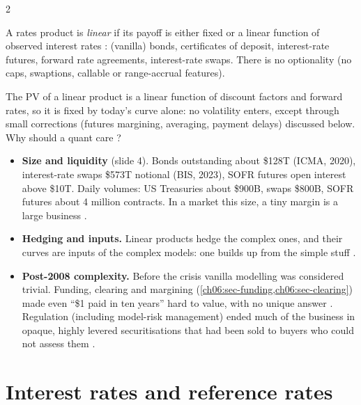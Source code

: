 \begin{paracol}{2}
\begin{definition}
A rates product is \emph{linear} if its payoff is either fixed or a linear function of observed interest rates
: (vanilla) bonds, certificates of deposit, interest-rate futures, forward rate agreements,
interest-rate swaps. There is no optionality (no caps, swaptions, callable or range-accrual features).
\end{definition}
The PV of a linear product is a linear function of discount factors and forward rates, so it is fixed by
today's curve alone: no volatility enters, except through small corrections (futures margining, averaging,
payment delays) discussed below. Why should a quant care ?
\begin{itemize}
  \item \textbf{Size and liquidity} (slide 4). Bonds outstanding about \$128T (ICMA, 2020), interest-rate swaps
        \$573T notional (BIS, 2023), SOFR futures open interest above \$10T. Daily volumes: US Treasuries
        about \$900B, swaps \$800B, SOFR futures about 4 million contracts. In a market this size, a tiny margin
        is a large business .
  \item \textbf{Hedging and inputs.} Linear products hedge the complex ones, and their curves are inputs of the
        complex models: one builds up from the simple stuff .
  \item \textbf{Post-2008 complexity.} Before the crisis vanilla modelling was considered trivial. Funding,
        clearing and margining (\cref{ch06:sec-funding,ch06:sec-clearing}) made even ``\$1 paid in ten
        years'' hard to value, with no unique answer . Regulation (including model-risk management)
        ended much of the business in opaque, highly levered securitisations that had been sold to buyers who
        could not assess them .
\end{itemize}

\section{Interest rates and reference rates}\label{ch06:sec-rates}


\end{paracol}
